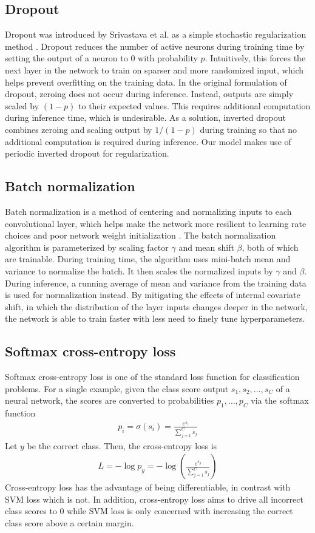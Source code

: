 \documentclass[10pt,twocolumn,letterpaper]{article}
\begin{document}
\subsection{Dropout}
Dropout was introduced by Srivastava et al. as a simple stochastic regularization method \cite{srivastava2014dropout}. Dropout reduces the number of active neurons during training time by setting the output of a neuron to 0 with probability $p$. Intuitively, this forces the next layer in the network to train on sparser and more randomized input, which helps prevent overfitting on the training data. In the original formulation of dropout, zeroing does not occur during inference. Instead, outputs are simply scaled by $(1 - p)$ to their expected values. This requires additional computation during inference time, which is undesirable. As a solution, inverted dropout combines zeroing and scaling output by $1 / (1 - p)$ during training so that no additional computation is required during inference. Our model makes use of periodic inverted dropout for regularization.

\subsection{Batch normalization}
Batch normalization is a method of centering and normalizing inputs to each convolutional layer, which helps make the network more resilient to learning rate choices and poor network weight initialization \cite{ioffe2015batch}. The batch normalization algorithm is parameterized by scaling factor $\gamma$ and mean shift $\beta$, both of which are trainable. During training time, the algorithm uses mini-batch mean and variance to normalize the batch. It then scales the normalized inputs by $\gamma$ and $\beta$. During inference, a running average of mean and variance from the training data is used for normalization instead. By mitigating the effects of internal covariate shift, in which the distribution of the layer inputs changes deeper in the network, the network is able to train faster with less need to finely tune hyperparameters.

\subsection{Softmax cross-entropy loss}
Softmax cross-entropy loss is one of the standard loss function for classification problems. For a single example, given the class score output $s_1, s_2, \dots, s_C$ of a neural network, the scores are converted to probabilities $p_1, \dots, p_C$ via the softmax function 
\begin{align}
p_i = \sigma(s_i) = \frac{e^{s_i}}{\sum_{j = 1}^C s_j}
\end{align}
 Let $y$ be the correct class. Then, the cross-entropy loss is 
 \begin{align}
 L = -\log p_y = -\log \left( \frac{e^{s_y}}{\sum_{j = 1}^C s_j} \right)
 \end{align}
  Cross-entropy loss has the advantage of being differentiable, in contrast with SVM loss which is not. In addition, cross-entropy loss aims to drive all incorrect class scores to 0 while SVM loss is only concerned with increasing the correct class score above a certain margin.
\end{document}
